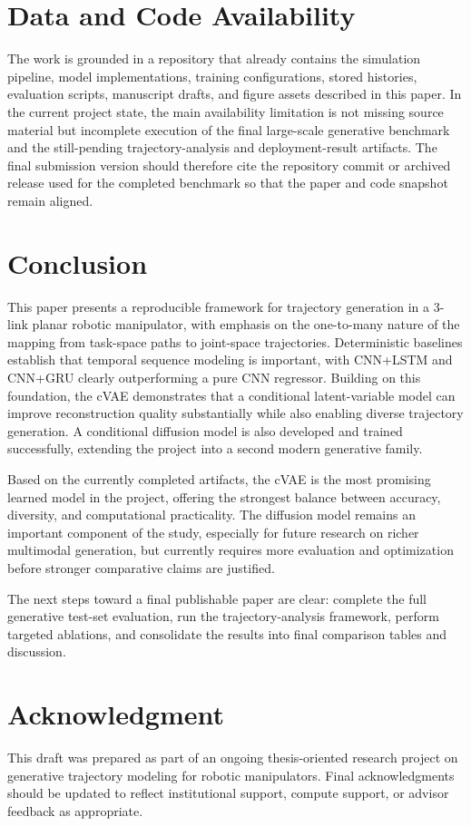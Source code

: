 \documentclass[11pt]{article}
\begin{document}
\section{Data and Code Availability}

The work is grounded in a repository that already contains the simulation pipeline, model implementations, training configurations, stored histories, evaluation scripts, manuscript drafts, and figure assets described in this paper. In the current project state, the main availability limitation is not missing source material but incomplete execution of the final large-scale generative benchmark and the still-pending trajectory-analysis and deployment-result artifacts. The final submission version should therefore cite the repository commit or archived release used for the completed benchmark so that the paper and code snapshot remain aligned.

\section{Conclusion}

This paper presents a reproducible framework for trajectory generation in a 3-link planar robotic manipulator, with emphasis on the one-to-many nature of the mapping from task-space paths to joint-space trajectories. Deterministic baselines establish that temporal sequence modeling is important, with CNN+LSTM and CNN+GRU clearly outperforming a pure CNN regressor. Building on this foundation, the cVAE demonstrates that a conditional latent-variable model can improve reconstruction quality substantially while also enabling diverse trajectory generation. A conditional diffusion model is also developed and trained successfully, extending the project into a second modern generative family.

Based on the currently completed artifacts, the cVAE is the most promising learned model in the project, offering the strongest balance between accuracy, diversity, and computational practicality. The diffusion model remains an important component of the study, especially for future research on richer multimodal generation, but currently requires more evaluation and optimization before stronger comparative claims are justified.

The next steps toward a final publishable paper are clear: complete the full generative test-set evaluation, run the trajectory-analysis framework, perform targeted ablations, and consolidate the results into final comparison tables and discussion.

\section*{Acknowledgment}

This draft was prepared as part of an ongoing thesis-oriented research project on generative trajectory modeling for robotic manipulators. Final acknowledgments should be updated to reflect institutional support, compute support, or advisor feedback as appropriate.



\end{document}
